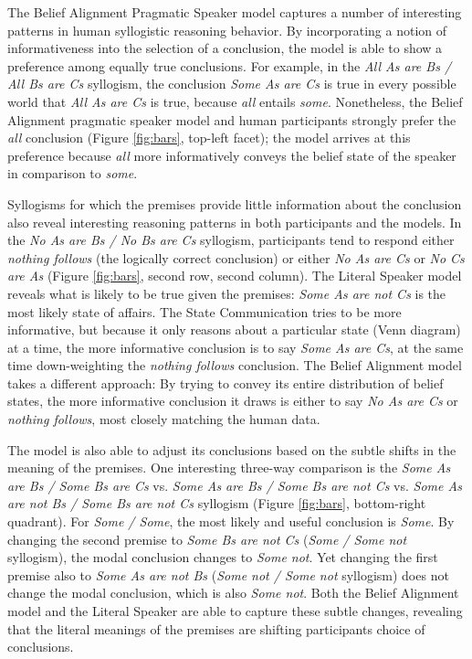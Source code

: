 \documentclass[floatsintext, doc]{apa6}
\begin{document}
The Belief Alignment Pragmatic Speaker model captures a number of interesting patterns in human syllogistic reasoning behavior. 
By incorporating a notion of informativeness into the selection of a conclusion, the model is able to  show a preference among equally true conclusions. For example, in the \emph{All As are Bs / All Bs are Cs} syllogism, the conclusion \emph{Some As are Cs} is true in every possible world that \emph{All As are Cs} is true, because \emph{all} entails \emph{some}. Nonetheless, the Belief Alignment pragmatic speaker model and human participants strongly prefer the \emph{all} conclusion (Figure \ref{fig:bars}, top-left facet); the model arrives at this preference because \emph{all} more informatively conveys the belief state of the speaker in comparison to \emph{some}.

Syllogisms for which the premises provide little information about the conclusion also reveal interesting reasoning patterns in both participants and the models.
In the \emph{No As are Bs / No Bs are Cs} syllogism, participants tend to respond either \emph{nothing follows} (the logically correct conclusion) or either \emph{No As are Cs} or \emph{No Cs are As} (Figure \ref{fig:bars}, second row, second column). 
The Literal Speaker model reveals what is likely to be true given the premises: \emph{Some As are not Cs} is the most likely state of affairs. 
The State Communication tries to be more informative, but because it only reasons about a particular state (Venn diagram) at a time, the more informative conclusion is to say \emph{Some As are Cs}, at the same time down-weighting the \emph{nothing follows} conclusion.
The Belief Alignment model takes a different approach: By trying to convey its entire distribution of belief states, the more informative conclusion it draws is either to say \emph{No As are Cs} or \emph{nothing follows}, most closely matching the human data. 

The model is also able to adjust its conclusions based on the subtle shifts in the meaning of the premises. One interesting three-way comparison is the \emph{Some As are Bs / Some Bs are Cs} vs. \emph{Some As are Bs / Some Bs are not Cs} vs. \emph{Some As are not Bs / Some Bs are not Cs} syllogism  (Figure \ref{fig:bars}, bottom-right quadrant).
For \emph{Some / Some}, the most likely and useful conclusion is \emph{Some}.
By changing the second premise to \emph{Some Bs are not Cs} (\emph{Some / Some not} syllogism), the modal conclusion changes to \emph{Some not}.
Yet changing the first premise also to \emph{Some As are not Bs} (\emph{Some not / Some not} syllogism) does not change the modal conclusion, which is also \emph{Some not}. 
Both the Belief Alignment model and the Literal Speaker are able to capture these subtle changes, revealing that the literal meanings of the premises are shifting participants choice of conclusions. 
\end{document}

